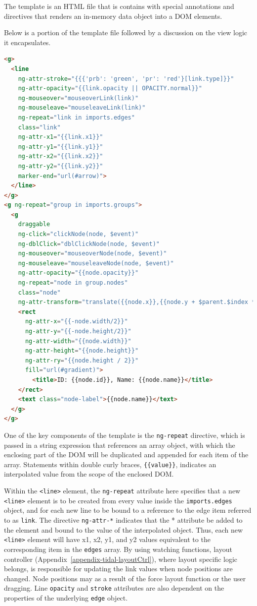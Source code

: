 The template is an HTML file that is contains with special annotations and directives that renders an in-memory data object into a DOM elements.

Below is a portion of the template file followed by a discussion on the view logic it encapsulates.

\begin{lstlisting}[language=html]
<g>
  <line
    ng-attr-stroke="{{{'prb': 'green', 'pr': 'red'}[link.type]}}"
    ng-attr-opacity="{{link.opacity || OPACITY.normal}}"
    ng-mouseover="mouseoverLink(link)"
    ng-mouseleave="mouseleaveLink(link)"
    ng-repeat="link in imports.edges"
    class="link"
    ng-attr-x1="{{link.x1}}"
    ng-attr-y1="{{link.y1}}"
    ng-attr-x2="{{link.x2}}"
    ng-attr-y2="{{link.y2}}"
    marker-end="url(#arrow)">
  </line>
</g>
<g ng-repeat="group in imports.groups">
  <g
    draggable
    ng-click="clickNode(node, $event)"
    ng-dblClick="dblClickNode(node, $event)"
    ng-mouseover="mouseoverNode(node, $event)"
    ng-mouseleave="mouseleaveNode(node, $event)"
    ng-attr-opacity="{{node.opacity}}"
    ng-repeat="node in group.nodes"
    class="node"
    ng-attr-transform="translate({{node.x}},{{node.y + $parent.$index * imports.subgraph.height}})">
    <rect
      ng-attr-x="{{-node.width/2}}"
      ng-attr-y="{{-node.height/2}}"
      ng-attr-width="{{node.width}}"
      ng-attr-height="{{node.height}}"
      ng-attr-ry="{{node.height / 2}}"
      fill="url(#gradient)">
        <title>ID: {{node.id}}, Name: {{node.name}}</title>
    </rect>
    <text class="node-label">{{node.name}}</text>
  </g>
</g>

\end{lstlisting}

One of the key components of the template is the \texttt{ng-repeat} directive, which is passed in a string expression that references an array object, with which the enclosing part of the DOM will be duplicated and appended for each item of the array.
Statements within double curly braces, \texttt{\{\{value\}\}}, indicates an interpolated value from the scope of the enclosed DOM.

Within the \texttt{<line>} element, the \texttt{ng-repeat} attribute here specifies that a new \texttt{<line>} element is to be created from every value inside the \texttt{imports.edges} object, and for each new line to be bound to a reference to the edge item referred to as \texttt{link}.
The directive \texttt{ng-attr-*} indicates that the * attribute be added to the element and bound to the value of the interpolated object.
Thus, each new \texttt{<line>} element will have x1, x2, y1, and y2 values equivalent to the corresponding item in the \texttt{edges} array.
By using watching functions, layout controller (Appendix~\ref{appendix-tidal-layoutCtrl}), where layout specific logic belongs, is responsible for updating the link values when node positions are changed.
Node positions may as a result of the force layout function or the user dragging.
Line \texttt{opacity} and \texttt{stroke} attributes are also dependent on the properties of the underlying \texttt{edge} object.

